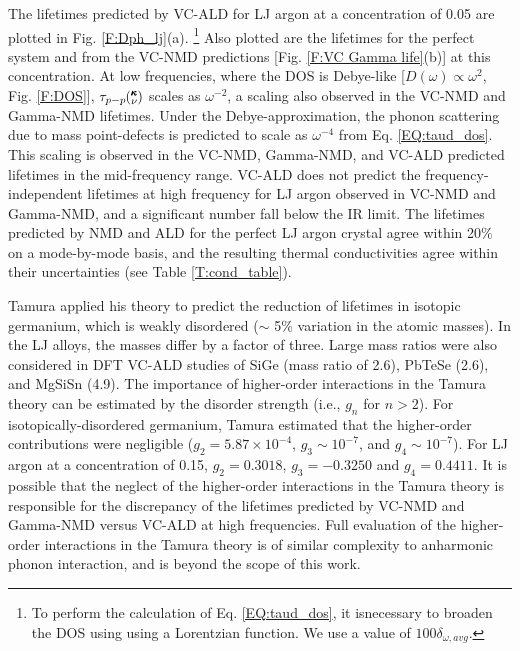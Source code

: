 The lifetimes predicted by VC-ALD for LJ argon at a concentration 
of 0.05 are plotted in Fig. \ref{F:Dph_lj}(a).
\footnote{To perform the calculation of Eq. \eqref{EQ:taud_dos}, 
it isnecessary to broaden the DOS using using a Lorentzian function.
\cite{tamura_isotope_1983} We use a value of $100\delta_{\omega,avg}$.} 
Also plotted are the lifetimes for the perfect system and from the 
VC-NMD predictions [Fig. \ref{F:VC Gamma life}(b)] at this 
concentration. At low frequencies, where the DOS is Debye-like 
[$D(\omega) \propto \omega^{2}$, Fig. \ref{F:DOS}], 
$\tau_{p-p}\mspace{-4.0mu}\left(\mspace{-8.0mu} \begin{smallmatrix}&\pmb{\kappa} \\&\nu\end{smallmatrix} \mspace{-3.0mu}\right)$ scales as $\omega^{-2}$, 
a scaling also observed in the VC-NMD and Gamma-NMD lifetimes. 
Under the Debye-approximation, 
the phonon scattering due to mass point-defects 
is predicted to scale as $\omega^{-4}$ from Eq. \eqref{EQ:taud_dos}.
\cite{mattis_phonon_1957,tamura_isotope_1983} 
This scaling is observed in the VC-NMD, Gamma-NMD, and VC-ALD 
predicted lifetimes in the mid-frequency range.  
VC-ALD does not predict the frequency-independent lifetimes 
at high frequency for LJ argon observed in VC-NMD and Gamma-NMD,  
and a significant number fall below the IR limit. 
The lifetimes predicted by 
NMD and ALD for the perfect LJ argon crystal agree 
within 20$\%$ on a mode-by-mode basis, and the 
resulting thermal conductivities agree within their uncertainties 
(see Table \ref{T:cond_table}).

Tamura applied his theory to predict the reduction of lifetimes 
in isotopic germanium, which is weakly disordered 
($\sim$ 5$\%$ variation in the atomic masses). In the LJ alloys, the 
masses differ by a factor of three. Large mass ratios were also 
considered in DFT VC-ALD studies of SiGe  
(mass ratio of 2.6)\cite{garg_role_2011}, 
PbTeSe (2.6)\cite{tian_phonon_2012}, 
and MgSiSn (4.9)\cite{li_thermal_2012}. 
The importance of higher-order interactions in 
the Tamura theory can be estimated by the disorder strength 
(i.e., $g_n$ for $n > 2$).\cite{tamura_isotope_1983} 
For isotopically-disordered germanium, Tamura estimated that the 
higher-order contributions were negligible ($g_2 = 5.87\times10^{-4}$, 
$g_3 \sim 10^{-7}$, and $g_4 \sim 10^{-7}$).\cite{tamura_isotope_1983} 
For LJ argon at a concentration of 0.15,  
$g_2 = 0.3018$, $g_3 = -0.3250$ and $g_4 = 0.4411$. 
It is possible that the neglect of the higher-order interactions 
in the Tamura theory is responsible for the 
discrepancy of the lifetimes predicted by VC-NMD and Gamma-NMD 
versus VC-ALD at high frequencies. Full evaluation of the 
higher-order interactions in the Tamura theory is of similar 
complexity to anharmonic phonon interaction,
\cite{maradudin_scattering_1962,ecsedy_thermal_1977,
turney_predicting_2009-1} and is beyond the scope of this work.

